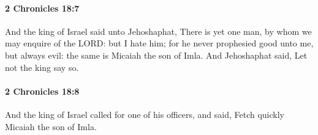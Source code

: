 		\paragraph{2 Chronicles 18:7} %
			\label{2CHRONICLES-18-7}

			And the king of Israel said unto Jehoshaphat, There is yet one man, by whom we may enquire of the LORD: but I hate him; for he never prophesied good unto me, but always evil: the same is Micaiah the son of Imla. And Jehoshaphat said, Let not the king say so.


		\paragraph{2 Chronicles 18:8} %
			\label{2CHRONICLES-18-8}

			And the king of Israel called for one of his officers, and said, Fetch quickly Micaiah the son of Imla.

